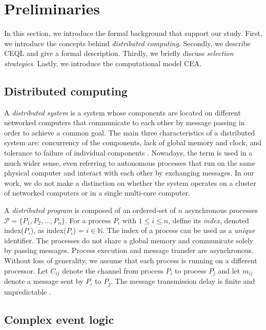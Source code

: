\chapter{Preliminaries}\label{chapter:preliminaries}

In this section, we introduce the formal background that support our study.
First, we introduce the concepts behind \emph{distributed computing}.
Secondly, we describe CEQL and give a formal description.
Thirdly, we briefly discuss \emph{selection strategies}.
Lastly, we introduce the computational model CEA.

\section{Distributed computing}\label{sec:distributed_computing}

A \emph{distributed system} is a system whose components are located on different networked computers that communicate to each other by message passing in order to achieve a common goal. The main three characteristics of a distributed system are: concurrency of the components, lack of global memory and clock, and tolerance to failure of individual components \cite{distributed-computing-book}. Nowadays, the term is used in a much wider sense, even referring to autonomous processes that run on the same physical computer and interact with each other by exchanging messages. In our work, we do not make a distinction on whether the system operates on a cluster of networked computers or in a single multi-core computer.

A \emph{distributed program} is composed of an ordered-set of $n$ asynchronous processes $\mathcal{P} = \{ P_{1}, P_{2}, \ldots, P_{n}\}$. For a process $P_{i}$ with $1 \le i \le n$, define its \emph{index}, denoted index($P_{i}$), as index($P_{i}$) = $i \in \mathbb{N}$. The index of a process can be used as a \emph{unique} identifier. The processes do not share a global memory and communicate solely by passing messages. Process execution and message transfer are asynchronous. Without loss of generality, we assume that each process is running on a different processor. Let $C_{ij}$ denote the channel from process $P_{i}$ to process $P_{j}$ and let $m_{ij}$ denote a message sent by $P_{i}$ to $P_{j}$. The message transmission delay is finite and unpredictable \cite{distributed-computing-book}.

\section{Complex event logic}\label{sec:ceql}

